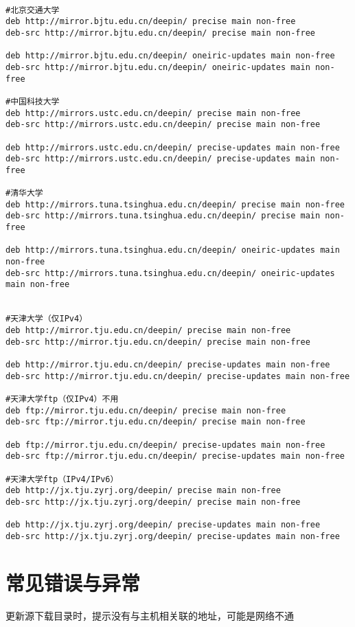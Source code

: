 \begin{verbatim}

#北京交通大学
deb http://mirror.bjtu.edu.cn/deepin/ precise main non-free
deb-src http://mirror.bjtu.edu.cn/deepin/ precise main non-free

deb http://mirror.bjtu.edu.cn/deepin/ oneiric-updates main non-free
deb-src http://mirror.bjtu.edu.cn/deepin/ oneiric-updates main non-free

#中国科技大学
deb http://mirrors.ustc.edu.cn/deepin/ precise main non-free
deb-src http://mirrors.ustc.edu.cn/deepin/ precise main non-free

deb http://mirrors.ustc.edu.cn/deepin/ precise-updates main non-free
deb-src http://mirrors.ustc.edu.cn/deepin/ precise-updates main non-free

#清华大学
deb http://mirrors.tuna.tsinghua.edu.cn/deepin/ precise main non-free
deb-src http://mirrors.tuna.tsinghua.edu.cn/deepin/ precise main non-free

deb http://mirrors.tuna.tsinghua.edu.cn/deepin/ oneiric-updates main non-free
deb-src http://mirrors.tuna.tsinghua.edu.cn/deepin/ oneiric-updates main non-free


#天津大学（仅IPv4）
deb http://mirror.tju.edu.cn/deepin/ precise main non-free
deb-src http://mirror.tju.edu.cn/deepin/ precise main non-free

deb http://mirror.tju.edu.cn/deepin/ precise-updates main non-free
deb-src http://mirror.tju.edu.cn/deepin/ precise-updates main non-free

#天津大学ftp（仅IPv4）不用
deb ftp://mirror.tju.edu.cn/deepin/ precise main non-free
deb-src ftp://mirror.tju.edu.cn/deepin/ precise main non-free

deb ftp://mirror.tju.edu.cn/deepin/ precise-updates main non-free
deb-src ftp://mirror.tju.edu.cn/deepin/ precise-updates main non-free

#天津大学ftp（IPv4/IPv6）
deb http://jx.tju.zyrj.org/deepin/ precise main non-free
deb-src http://jx.tju.zyrj.org/deepin/ precise main non-free

deb http://jx.tju.zyrj.org/deepin/ precise-updates main non-free
deb-src http://jx.tju.zyrj.org/deepin/ precise-updates main non-free
\end{verbatim}


\section{常见错误与异常}

更新源下载目录时，提示没有与主机相关联的地址，可能是网络不通

